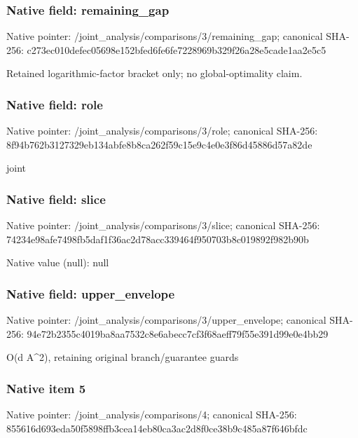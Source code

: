 \documentclass[10pt,a4paper]{article}
\begin{document}
\subsubsection{Native field: remaining\_\allowbreak{}gap}
Native pointer: /joint\_\allowbreak{}analysis/comparisons/3/remaining\_\allowbreak{}gap; canonical SHA-256: c273ec010defec05698e152bfed6fe6fe7228969b329f26a28e5cade1aa2e5c5

\begingroup\raggedright\sloppy Retained logarithmic-factor bracket only;\allowbreak{} no global-optimality claim.\par\endgroup

\subsubsection{Native field: role}
Native pointer: /joint\_\allowbreak{}analysis/comparisons/3/role; canonical SHA-256: 8f94b762b3127329eb134abfe8b8ca262f59c15e9c4e0e3f86d45886d57a82de

\begingroup\raggedright\sloppy joint\par\endgroup

\subsubsection{Native field: slice}
Native pointer: /joint\_\allowbreak{}analysis/comparisons/3/slice; canonical SHA-256: 74234e98afe7498fb5daf1f36ac2d78acc339464f950703b8c019892f982b90b

Native value (null): null

\subsubsection{Native field: upper\_\allowbreak{}envelope}
Native pointer: /joint\_\allowbreak{}analysis/comparisons/3/upper\_\allowbreak{}envelope; canonical SHA-256: 94e72b2355c4019ba8aa7532c8e6abecc7cf3f68aeff79f55e391d99e0e4bb29

\begingroup\raggedright\sloppy O(d A\textasciicircum{}2),\allowbreak{} retaining original branch/\allowbreak{}guarantee guards\par\endgroup

\subsubsection{Native item 5}
Native pointer: /joint\_\allowbreak{}analysis/comparisons/4; canonical SHA-256: 855616d693eda50f5898ffb3cea14eb80ca3ac2d8f0ce38b9c485a87f646bfdc
\end{document}
